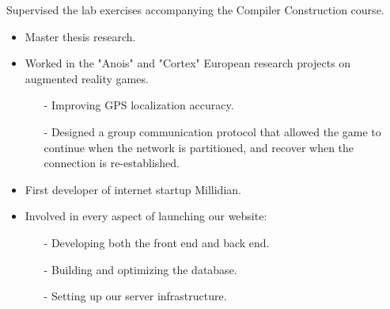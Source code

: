 \documentclass[10pt,a4paper]{../altacv}
\begin{document}
	\medskip
	
	Supervised the lab exercises accompanying the Compiler Construction course.
	
	\medskip
	
	
	
	\newpage
	\medskip\medskip{}
	
	\begin{itemize}
		\item Master thesis research.
		\item Worked in the "Anois" and "Cortex" European research projects on augmented reality games.
		\begin{itemize}
			\item[-] Improving GPS localization accuracy.
			\item[-] Designed a group communication protocol that allowed the game to continue when the network is partitioned, and recover when the connection is re-established.
		\end{itemize}
	\end{itemize}
	
	\medskip
	
	
	
	
	
	\medskip\medskip{}
	
	\begin{itemize}
		\item First developer of internet startup Millidian.
		\item Involved in every aspect of launching our website:
		\begin{itemize}
			\item[-] Developing both the front end and back end.
			\item[-] Building and optimizing the database.
			\item[-] Setting up our server infrastructure.
		\end{itemize}
	\end{itemize}
	
	\medskip
	
	
	
	
\end{document}
